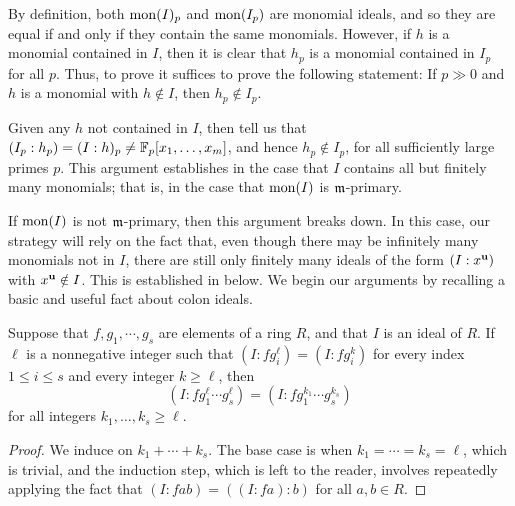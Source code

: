 \documentclass[11pt]{amsart}
\begin{document}
By definition, both $\operatorname{mon}(I)_p$ and $\operatorname{mon}(I_p)$ are monomial ideals, and so they are equal if and only if they contain the same monomials.
However, if $h$ is a monomial contained in $I$, then it is clear that $h_p$ is a monomial contained in $I_p$ for all $p$.
Thus, to prove  it suffices to prove the following statement:
If $p \gg 0$ and $h$ is a monomial with $h \notin I$, then $h_p \notin I_p$.

Given any $h$ not contained in $I$, then  tell us that $(I_p:h_p) = (I:h)_p \ne \mathbb{F}_p[x_1,\ldots,x_m]$, and hence $h_p \notin I_p$, for all sufficiently large primes $p$.
This argument establishes  in the case that $I$ contains all but finitely many monomials;  that is, in the case that $ \operatorname{mon}(I)$ is $\mathfrak{m}$-primary.


If $\operatorname{mon}(I)$ is not $\mathfrak{m}$-primary, then this argument breaks down.
In this case, our strategy will rely on the fact that, even though there may be infinitely many monomials not in $I$, there are still only finitely many ideals of the form $(I:x^{\mathbf{u}})$ with $x^{\mathbf{u}} \notin I$.
This is established in  below.
We begin our arguments by recalling a basic and useful fact about colon ideals.

\begin{lemma}
   \label{colon-product-stabilization: L}
   Suppose that $f,g_1, \cdots, g_s$ are elements of a ring $R$, and that $I$ is an ideal of $R$.
   If $\ell$ is a nonnegative integer such that $(I: f g_i^\ell) = (I: f g_i^k)$ for every index $1 \leq i \leq s$ and every integer $k \geq \ell$, then
   \[
      (I: f g_1^\ell \cdots g_s^\ell) = (I: f g_1^{k_1} \cdots g_s^{k_s})
   \]
   for all integers $k_1, \ldots, k_s \geq \ell$.
\end{lemma}

\begin{proof}
We induce on $k_1 + \cdots + k_s$.  The base case is when $k_1 = \cdots = k_s = \ell$, which is trivial, and the induction step, which is left to the reader, involves repeatedly applying the fact that $(I:fab) = ((I:fa):b)$ for all $a,b \in R$.
\end{proof}
\end{document}
